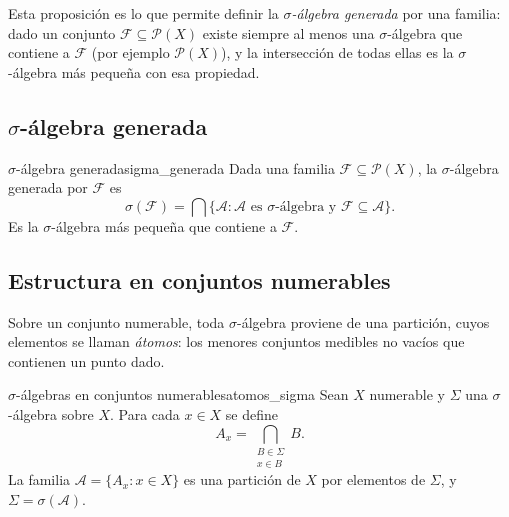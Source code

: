 \documentclass[11pt, a4paper]{article}
\begin{document}
\obs Esta proposición es lo que permite definir la \emph{$\sigma$-álgebra generada} por una
familia: dado un conjunto $\mathcal{F} \subseteq \mathcal{P}(X)$ existe siempre al menos una
$\sigma$-álgebra que contiene a $\mathcal{F}$ (por ejemplo $\mathcal{P}(X)$), y la intersección
de todas ellas es la $\sigma$-álgebra más pequeña con esa propiedad.

\subsection{\texorpdfstring{$\sigma$}{σ}-álgebra generada}

\begin{definicion}{$\sigma$-álgebra generada}{sigma_generada}
Dada una familia $\mathcal{F} \subseteq \mathcal{P}(X)$, la $\sigma$-álgebra generada por
$\mathcal{F}$ es
$$ \sigma(\mathcal{F}) = \bigcap \{ \mathcal{A} : \mathcal{A} \text{ es }\sigma\text{-álgebra y }
\mathcal{F} \subseteq \mathcal{A} \}. $$
Es la $\sigma$-álgebra más pequeña que contiene a $\mathcal{F}$.
\end{definicion}

\subsection{Estructura en conjuntos numerables}

Sobre un conjunto numerable, toda $\sigma$-álgebra proviene de una partición, cuyos elementos
se llaman \emph{átomos}: los menores conjuntos medibles no vacíos que contienen un punto dado.

\begin{teorema}{$\sigma$-álgebras en conjuntos numerables}{atomos_sigma}
Sean $X$ numerable y $\Sigma$ una $\sigma$-álgebra sobre $X$. Para cada $x \in X$ se define
$$ A_x = \bigcap_{\substack{B \in \Sigma \\ x \in B}} B. $$
La familia $\mathcal{A} = \{A_x : x \in X\}$ es una partición de $X$ por elementos de $\Sigma$,
y $\Sigma = \sigma(\mathcal{A})$.
\end{teorema}
\end{document}
